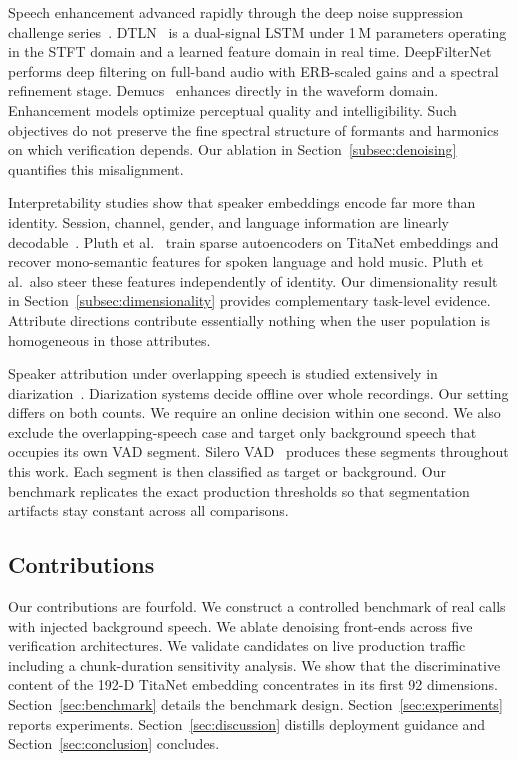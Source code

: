 \documentclass{llncs}
\begin{document}
Speech enhancement advanced rapidly through the deep noise suppression challenge series~\cite{dns}. DTLN~\cite{dtln} is a dual-signal LSTM under 1\,M parameters operating in the STFT domain and a learned feature domain in real time. DeepFilterNet~\cite{dfn} performs deep filtering on full-band audio with ERB-scaled gains and a spectral refinement stage. Demucs~\cite{demucs} enhances directly in the waveform domain. Enhancement models optimize perceptual quality and intelligibility. Such objectives do not preserve the fine spectral structure of formants and harmonics on which verification depends. Our ablation in Section~\ref{subsec:denoising} quantifies this misalignment.

Interpretability studies show that speaker embeddings encode far more than identity. Session, channel, gender, and language information are linearly decodable~\cite{wang2017,raj2019}. Pluth et al.~\cite{sae} train sparse autoencoders on TitaNet embeddings and recover mono-semantic features for spoken language and hold music. Pluth et al.\ also steer these features independently of identity. Our dimensionality result in Section~\ref{subsec:dimensionality} provides complementary task-level evidence. Attribute directions contribute essentially nothing when the user population is homogeneous in those attributes.

Speaker attribution under overlapping speech is studied extensively in diarization~\cite{diarization}. Diarization systems decide offline over whole recordings. Our setting differs on both counts. We require an online decision within one second. We also exclude the overlapping-speech case and target only background speech that occupies its own VAD segment. Silero VAD~\cite{silero} produces these segments throughout this work. Each segment is then classified as target or background. Our benchmark replicates the exact production thresholds so that segmentation artifacts stay constant across all comparisons.

\subsection{Contributions}
Our contributions are fourfold. We construct a controlled benchmark of real calls with injected background speech. We ablate denoising front-ends across five verification architectures. We validate candidates on live production traffic including a chunk-duration sensitivity analysis. We show that the discriminative content of the 192-D TitaNet embedding concentrates in its first 92 dimensions. Section~\ref{sec:benchmark} details the benchmark design. Section~\ref{sec:experiments} reports experiments. Section~\ref{sec:discussion} distills deployment guidance and Section~\ref{sec:conclusion} concludes.
\end{document}
